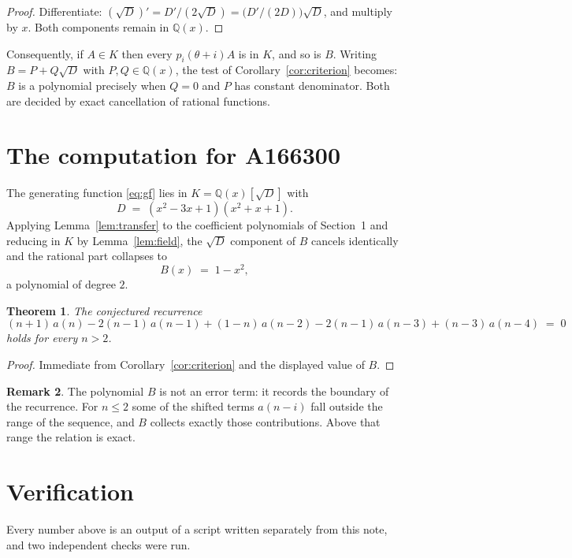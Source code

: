 \documentclass[11pt,a4paper]{article}
\theoremstyle{plain}
\newtheorem{theorem}{Theorem}
\theoremstyle{definition}
\newtheorem{remark}[theorem]{Remark}
\begin{document}
\begin{proof}
Differentiate: $(\sqrt{D})'=D'/(2\sqrt{D})=\bigl(D'/(2D)\bigr)\sqrt{D}$, and multiply by
$x$. Both components remain in $\mathbb{Q}(x)$.
\end{proof}

Consequently, if $A\in K$ then every $p_{i}(\theta+i)A$ is in $K$, and so is $B$. Writing
$B=P+Q\sqrt{D}$ with $P,Q\in\mathbb{Q}(x)$, the test of Corollary~\ref{cor:criterion}
becomes: $B$ is a polynomial precisely when $Q=0$ and $P$ has constant denominator. Both
are decided by exact cancellation of rational functions.

\section{The computation for A166300}

The generating function \eqref{eq:gf} lies in $K=\mathbb{Q}(x)[\sqrt{D}]$ with
\[
D \;=\; \left(x^{2} - 3 x + 1\right) \left(x^{2} + x + 1\right) .
\]
Applying Lemma~\ref{lem:transfer} to the coefficient polynomials of Section~1 and reducing
in $K$ by Lemma~\ref{lem:field}, the $\sqrt{D}$ component of $B$ cancels identically and
the rational part collapses to
\[
B(x)\;=\;1 - x^{2} ,
\]
a polynomial of degree $2$.

\begin{theorem}
The conjectured recurrence
\[
(n + 1)\,a(n) -  2 \left(n - 1\right)\,a(n-1) + (1 - n)\,a(n-2) -  2 \left(n - 1\right)\,a(n-3) + (n - 3)\,a(n-4) \;=\;0
\]
holds for every $n>2$.
\end{theorem}

\begin{proof}
Immediate from Corollary~\ref{cor:criterion} and the displayed value of $B$.
\end{proof}

\begin{remark}
The polynomial $B$ is not an error term: it records the boundary of the recurrence. For
$n\le2$ some of the shifted terms $a(n-i)$ fall outside the range of the sequence,
and $B$ collects exactly those contributions. Above that range the relation is exact.
\end{remark}

\section{Verification}

Every number above is an output of a script written separately from this note, and two
independent checks were run.
\end{document}

